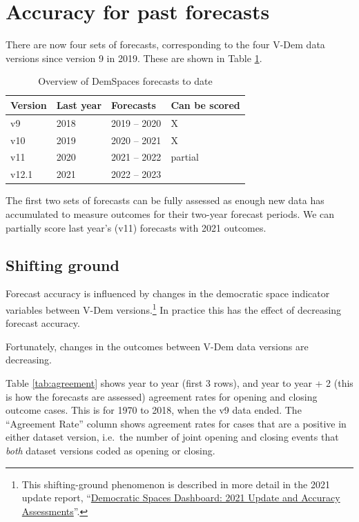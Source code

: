 \documentclass[
  11pt,
]{article}
\begin{document}
\hypertarget{accuracy-for-past-forecasts}{%
\section{Accuracy for past
forecasts}\label{accuracy-for-past-forecasts}}

There are now four sets of forecasts, corresponding to the four V-Dem
data versions since version 9 in 2019. These are shown in Table
\ref{tab:overview}.

\begin{table}

\caption{\label{tab:overview}Overview of DemSpaces forecasts to date}
\centering
\begin{tabular}[t]{llll}
\toprule
Version & Last year & Forecasts & Can be scored\\
\midrule
v9 & 2018 & 2019 – 2020 & X\\
v10 & 2019 & 2020 – 2021 & X\\
v11 & 2020 & 2021 – 2022 & partial\\
v12.1 & 2021 & 2022 – 2023 & \\
\bottomrule
\end{tabular}
\end{table}

The first two sets of forecasts can be fully assessed as enough new data
has accumulated to measure outcomes for their two-year forecast periods.
We can partially score last year's (v11) forecasts with 2021 outcomes.

\hypertarget{shifting-ground}{%
\subsection{Shifting ground}\label{shifting-ground}}

Forecast accuracy is influenced by changes in the democratic space
indicator variables between V-Dem versions.\footnote{This
  shifting-ground phenomenon is described in more detail in the 2021
  update report,
  ``\href{https://github.com/vdeminstitute/demspaces/blob/main/2021-update/DemocraticSpaces2021.pdf}{Democratic
  Spaces Dashboard: 2021 Update and Accuracy Assessments}''.} In
practice this has the effect of decreasing forecast accuracy.

Fortunately, changes in the outcomes between V-Dem data versions are
decreasing.

Table \ref{tab:agreement} shows year to year (first 3 rows), and year to
year + 2 (this is how the forecasts are assessed) agreement rates for
opening and closing outcome cases. This is for 1970 to 2018, when the v9
data ended. The ``Agreement Rate'' column shows agreement rates for
cases that are a positive in either dataset version, i.e.~the number of
joint opening and closing events that \emph{both} dataset versions coded
as opening or closing.
\end{document}
